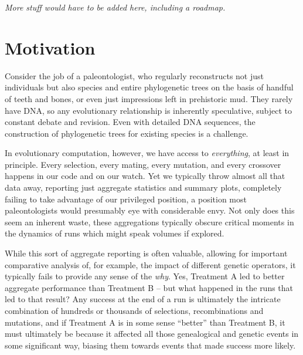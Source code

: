 \emph{More stuff would have to be added here, including a roadmap.}

\section{Motivation}
\label{sec:motivation}

Consider the job of a paleontologist, who regularly reconstructs not just individuals but also
species and entire phylogenetic trees on the basis of handful of teeth and bones, or even just
impressions left in prehistoric mud. They rarely have DNA, so any evolutionary relationship is
inherently speculative, subject to constant debate and revision. Even with detailed DNA sequences,
the construction of phylogenetic trees for existing species is a challenge.

In evolutionary computation, however, we have access to \emph{everything}, at least in principle. Every
selection, every mating, every mutation, and every crossover happens in our code and on our watch.
Yet we typically throw almost all that data away, reporting just aggregate statistics and summary
plots, completely failing to take advantage of our privileged position, a position most 
paleontologists would presumably eye with considerable envy. Not only does this seem an inherent
waste, these aggregations typically obscure critical moments in the dynamics of runs which might
speak volumes if explored.

While this sort of aggregate reporting is often valuable, allowing for important comparative
analysis of, for example, the impact of different genetic operators, it typically fails to provide
any sense of the \emph{why}. Yes, Treatment A led to better aggregate performance than 
Treatment B -- but what happened in the runs that led to that result? Any success at the end of a
run is ultimately the intricate combination of hundreds or thousands of selections, recombinations
and mutations, and if Treatment A is in some sense ``better'' than Treatment B, it must ultimately
be because it affected all those genealogical and genetic events in some significant way, biasing them
towards events that made success more likely.


